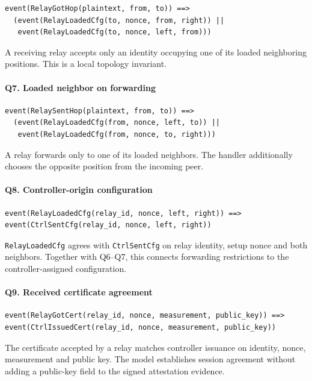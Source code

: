 \documentclass[futureinternet,article,submit,moreauthors]{Definitions/mdpi}
\begin{document}
\begin{lstlisting}
event(RelayGotHop(plaintext, from, to)) ==>
  (event(RelayLoadedCfg(to, nonce, from, right)) ||
   event(RelayLoadedCfg(to, nonce, left, from)))
\end{lstlisting}

A receiving relay accepts only an identity occupying one of its loaded neighboring positions. This is a local topology invariant.

\paragraph{Q7. Loaded neighbor on forwarding}

\begin{lstlisting}
event(RelaySentHop(plaintext, from, to)) ==>
  (event(RelayLoadedCfg(from, nonce, left, to)) ||
   event(RelayLoadedCfg(from, nonce, to, right)))
\end{lstlisting}

A relay forwards only to one of its loaded neighbors. The handler additionally chooses the opposite position from the incoming peer.

\paragraph{Q8. Controller-origin configuration}

\begin{lstlisting}
event(RelayLoadedCfg(relay_id, nonce, left, right)) ==> event(CtrlSentCfg(relay_id, nonce, left, right))
\end{lstlisting}

\texttt{RelayLoadedCfg} agrees with \texttt{CtrlSentCfg} on relay identity, setup nonce and both neighbors. Together with Q6--Q7, this connects forwarding restrictions to the controller-assigned configuration.

\paragraph{Q9. Received certificate agreement}

\begin{lstlisting}
event(RelayGotCert(relay_id, nonce, measurement, public_key)) ==> event(CtrlIssuedCert(relay_id, nonce, measurement, public_key))
\end{lstlisting}

The certificate accepted by a relay matches controller issuance on identity, nonce, measurement and public key. The model establishes session agreement without adding a public-key field to the signed attestation evidence.
\end{document}

